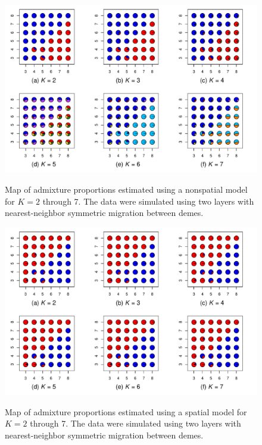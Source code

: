 \documentclass[10pt,letterpaper]{article}
\begin{document}
\newpage
\begin{figure}
	\centering
		{\includegraphics[width=\textwidth]{figs/sims/simK2_nsp_pies.pdf}}
	\caption{
	Map of admixture proportions estimated using a nonspatial model for $K=2$ through 7.
	The data were simulated using two layers with nearest-neighbor symmetric migration between demes.
    }\label{simK2_nsp_pies}
\end{figure}

\begin{figure}
	\centering
		{\includegraphics[width=\textwidth]{figs/sims/simK2_sp_pies.pdf}}
	\caption{
	Map of admixture proportions estimated using a spatial model for $K=2$ through 7.
	The data were simulated using two layers with nearest-neighbor symmetric migration between demes.
    }\label{simK2_sp_pies}
\end{figure}
\end{document}
